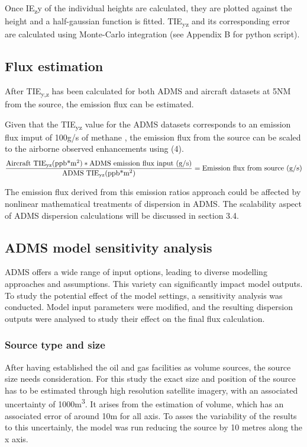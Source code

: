 \documentclass[12pt]{article}
\begin{document}
Once IE\textsubscript{z}y of the individual heights are calculated, they are plotted against the height and a half-gaussian function is fitted. TIE\textsubscript{yz} and its corresponding error are calculated using Monte-Carlo integration (see Appendix B for python script). 

 \subsection{Flux estimation}
After TIE\textsubscript{y,z} has been calculated for both ADMS and aircraft datasets at 5NM from the source, the emission flux can be estimated. 

Given that the  TIE\textsubscript{yz} value for the ADMS datasets corresponds to an emission flux imput of 100g/s of methane , the emission flux from the source can be scaled to the airborne observed enhancements using (4).
\begin{equation}
\frac{{\text{{Aircraft TIE\textsubscript{yz}}(ppb*m\textsuperscript{2})}}*{\text{ADMS emission flux input (g/s)}}}{{\text{{ADMS TIE\textsubscript{yz}(ppb*m\textsuperscript{2})}}}} = \text{{Emission flux from source (g/s)}}
\end{equation}

The emission flux derived from this emission ratios approach could be affected by nonlinear mathematical treatments of dispersion in ADMS. The scalability aspect of ADMS dispersion calculations will be discussed in section 3.4.
\subsection{ADMS model sensitivity analysis
}
ADMS offers a wide range of input options, leading to diverse modelling approaches and assumptions. This variety can significantly impact model outputs. To study the potential effect of the model settings, a sensitivity analysis was conducted. Model input parameters were modified, and the resulting dispersion outputs were analysed to study their effect on the final flux calculation. 
\subsubsection{Source type and size
}
After having established the oil and gas facilities as volume sources, the source size needs consideration.  For this study the exact size and position of the source has to be estimated through high resolution satellite imagery, with an associated uncertainty of 1000m\textsuperscript{3}. It arises from the estimation of volume, which has an associated error of around 10m for all axis. To asses the variability of the results to this uncertainly, the model was run reducing the source by 10 metres along the x axis. 
\end{document}
